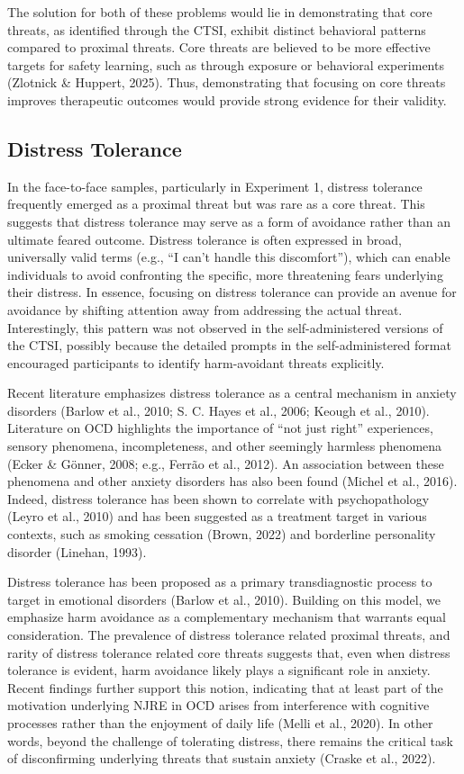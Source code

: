 \documentclass[
  man,floatsintext]{apa7}
\begin{document}
The solution for both of these problems would lie in demonstrating that core threats, as identified through the CTSI, exhibit distinct behavioral patterns compared to proximal threats.
Core threats are believed to be more effective targets for safety learning, such as through exposure or behavioral experiments (Zlotnick \& Huppert, 2025).
Thus, demonstrating that focusing on core threats improves therapeutic outcomes would provide strong evidence for their validity.

\subsection{Distress Tolerance}\label{distress-tolerance}

In the face-to-face samples, particularly in Experiment 1, distress tolerance frequently emerged as a proximal threat but was rare as a core threat.
This suggests that distress tolerance may serve as a form of avoidance rather than an ultimate feared outcome.
Distress tolerance is often expressed in broad, universally valid terms (e.g., ``I can't handle this discomfort''), which can enable individuals to avoid confronting the specific, more threatening fears underlying their distress.
In essence, focusing on distress tolerance can provide an avenue for avoidance by shifting attention away from addressing the actual threat.
Interestingly, this pattern was not observed in the self-administered versions of the CTSI, possibly because the detailed prompts in the self-administered format encouraged participants to identify harm-avoidant threats explicitly.

Recent literature emphasizes distress tolerance as a central mechanism in anxiety disorders (Barlow et al., 2010; S. C. Hayes et al., 2006; Keough et al., 2010).
Literature on OCD highlights the importance of ``not just right'' experiences, sensory phenomena, incompleteness, and other seemingly harmless phenomena (Ecker \& Gönner, 2008; e.g., Ferrão et al., 2012).
An association between these phenomena and other anxiety disorders has also been found (Michel et al., 2016).
Indeed, distress tolerance has been shown to correlate with psychopathology (Leyro et al., 2010) and has been suggested as a treatment target in various contexts, such as smoking cessation (Brown, 2022) and borderline personality disorder (Linehan, 1993).

Distress tolerance has been proposed as a primary transdiagnostic process to target in emotional disorders (Barlow et al., 2010).
Building on this model, we emphasize harm avoidance as a complementary mechanism that warrants equal consideration.
The prevalence of distress tolerance related proximal threats, and rarity of distress tolerance related core threats suggests that, even when distress tolerance is evident, harm avoidance likely plays a significant role in anxiety.
Recent findings further support this notion, indicating that at least part of the motivation underlying NJRE in OCD arises from interference with cognitive processes rather than the enjoyment of daily life (Melli et al., 2020).
In other words, beyond the challenge of tolerating distress, there remains the critical task of disconfirming underlying threats that sustain anxiety (Craske et al., 2022).
\end{document}
